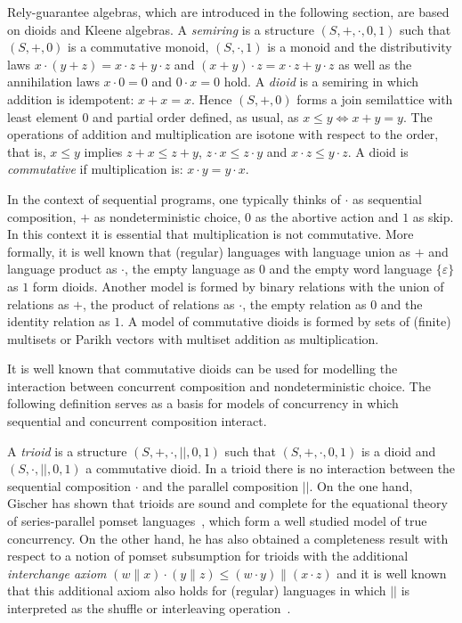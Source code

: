 \documentclass{llncs}
\begin{document}

Rely-guarantee algebras, which are introduced in the following
section, are based on dioids and Kleene algebras. A \emph{semiring} is
a structure $(S,+,\cdot,0,1)$ such that $(S,+,0)$ is a commutative
monoid, $(S,\cdot, 1)$ is a monoid and the distributivity laws $x\cdot
(y+z)=x\cdot z + y \cdot z$ and $(x+y)\cdot z = x\cdot z+y\cdot z$ as
well as the annihilation laws $x\cdot 0=0$ and $0\cdot x=0$ hold. A
\emph{dioid} is a semiring in which addition is idempotent:
$x+x=x$. Hence $(S,+,0)$ forms a join semilattice with least element
$0$ and partial order defined, as usual, as $x\le y\Leftrightarrow
x+y=y$. The operations of addition and multiplication are isotone with
respect to the order, that is, $x \le y $ implies $z+x\le z+y$,
$z\cdot x \le z\cdot y$ and $x\cdot z \le y\cdot z$. A dioid is
\emph{commutative} if multiplication is: $x\cdot y = y \cdot x$.

In the context of sequential programs, one typically thinks of $\cdot$
as sequential composition, $+$ as nondeterministic choice, $0$ as the
abortive action and $1$ as skip.  In this context it is essential that
multiplication is not commutative.  More formally, it is well known
that (regular) languages with language union as $+$ and language
product as $\cdot$, the empty language as $0$ and the empty word
language $\{\varepsilon\}$ as $1$ form dioids. Another model is formed
by binary relations with the union of relations as $+$, the product of
relations as $\cdot$, the empty relation as $0$ and the identity
relation as $1$. A model of commutative dioids is formed by sets of
(finite) multisets or Parikh vectors with multiset addition as
multiplication.

It is well known that commutative dioids can be used for modelling the
interaction between concurrent composition and nondeterministic
choice. The following definition serves as a basis for models of
concurrency in which sequential and concurrent composition
interact. 

A \emph{trioid} is a structure $(S,+,\cdot,||,0,1)$ such that
$(S,+,\cdot,0,1)$ is a dioid and $(S,\cdot,||,0,1)$ a commutative
dioid. In a trioid there is no interaction between the sequential
composition $\cdot$ and the parallel composition $||$. On the one
hand, Gischer has shown that trioids are sound and complete for the
equational theory of series-parallel pomset languages~\cite{Gischer},
which form a well studied model of true concurrency. On the other
hand, he has also obtained a completeness result with respect to a
notion of pomset subsumption for trioids with the additional
\emph{interchange axiom} $(w \| x) \cdot (y \| z) \le (w \cdot y) \|
(x \cdot z)$ and it is well known that this additional axiom also
holds for (regular) languages in which $||$ is interpreted as the
shuffle or interleaving operation~\cite{Gischer}.
\end{document}
